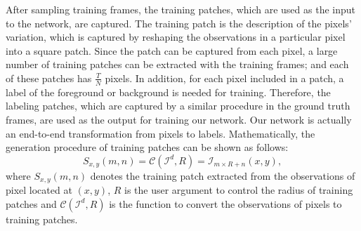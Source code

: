 \documentclass[journal]{IEEEtran}
\begin{document}
After sampling training frames,
the training patches, which are used as the input to the network, are captured.
%
The training patch is the description of the pixels' variation,
which is captured by reshaping the observations in a particular pixel into a square patch.
%
Since the patch can be captured from each pixel, 
a large number of training patches can be extracted with the training frames;
and each of these patches has $\frac{T}{N}$ pixels.
%
In addition, for each pixel included in a patch, a label of the foreground or background is needed for training.
%
Therefore,
the labeling patches, which are captured by a similar procedure in the ground truth frames,
are used as the output for training our network.
Our network is actually an end-to-end transformation from pixels to labels.
%
Mathematically, the generation procedure of training patches can be shown as follows:
\begin{equation}
    S_{x,y}(m,n) = \mathcal{C}(\mathcal{I}^d, R) = \mathcal{I}_{m \times R + n} (x,y),
    \label{eq_reshape}
\end{equation}
where $S_{x,y}(m,n)$ denotes the training patch extracted from the observations of pixel located at $(x,y)$,
$R$ is the user argument to control the radius of training patches
and $\mathcal{C}(\mathcal{I}^d, R)$ is the function to convert the observations of pixels to training patches.
% 
% 
% 
% 
% 
% 
% 
% 
% 
% 
% 
\end{document}
